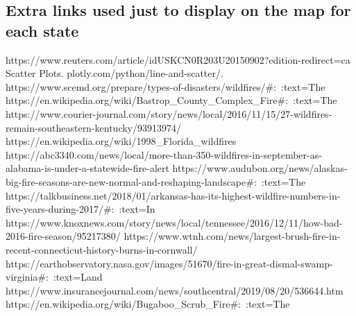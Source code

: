 \documentclass[fontsize=11pt]{article}
\begin{document}
\subsection*{Extra links used just to display on the map for each state}
\newline
https://www.reuters.com/article/idUSKCN0R203U20150902?edition-redirect=ca
\newline
Scatter Plots. plotly.com/python/line-and-scatter/.
\newline
https://www.scemd.org/prepare/types-of-disasters/wildfires/#:~:text=The%
\newline
https://en.wikipedia.org/wiki/Bastrop\_County\_Complex\_Fire#:~:text=The%
\newline
https://www.courier-journal.com/story/news/local/2016/11/15/27-wildfires-remain-southeastern-kentucky/93913974/
\newline
https://en.wikipedia.org/wiki/1998\_Florida\_wildfires
\newline
https://abc3340.com/news/local/more-than-350-wildfires-in-september-as-alabama-is-under-a-statewide-fire-alert
\newline
https://www.audubon.org/news/alaskas-big-fire-seasons-are-new-normal-and-reshaping-landscape#:~:text=The%
\newline
https://talkbusiness.net/2018/01/arkansas-has-its-highest-wildfire-numbers-in-five-years-during-2017/#:~:text=In%
\newline
https://www.knoxnews.com/story/news/local/tennessee/2016/12/11/how-bad-2016-fire-season/95217380/
\newline
https://www.wtnh.com/news/largest-brush-fire-in-recent-connecticut-history-burns-in-cornwall/
\newline
https://earthobservatory.nasa.gov/images/51670/fire-in-great-dismal-swamp-virginia#:~:text=Land%
\newline
https://www.insurancejournal.com/news/southcentral/2019/08/20/536644.htm
\newline
https://en.wikipedia.org/wiki/Bugaboo\_Scrub\_Fire#:~:text=The%
\newline
\end{document}
